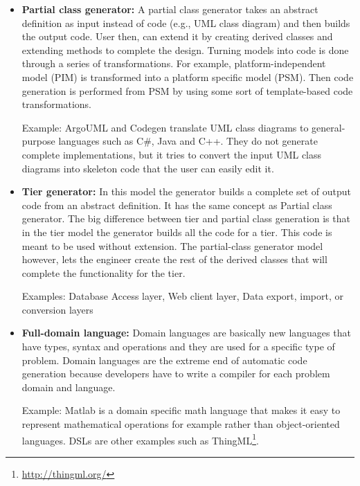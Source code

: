 \begin{itemize}
\item \textbf{Partial class generator:} A partial class generator takes an abstract definition as input instead of code (e.g., UML class diagram) and then builds the output code. User then, can extend it by creating derived classes and extending methods to complete the design. Turning models into code is done through a series of transformations. For example, platform-independent model (PIM) is transformed into a platform specific model (PSM). Then code generation is performed from PSM by using some sort of template-based code transformations.

Example: ArgoUML and Codegen translate UML class diagrams to general-purpose languages such as C\#, Java and C++. They do not generate complete implementations, but it tries to convert the input UML class diagrams into skeleton code that the user can easily edit it. 

\item \textbf{Tier generator:} In this model the generator builds a complete set of output code from an abstract definition. It has the same concept as Partial class generator. The big difference between tier and partial class generation is that in the tier model the generator builds all the code for a tier. This code is meant to be used without extension. The partial-class generator model however, lets the engineer create the rest of the derived classes that will complete the functionality for the tier.

Examples: Database Access layer, Web client layer, Data export, import, or conversion layers

\item \textbf{Full-domain language:} Domain languages are basically new languages that have types, syntax and operations and they are used for a specific type of problem. 
Domain languages are the extreme end of automatic code generation because developers have to write a compiler for each problem domain and language. 

Example: Matlab is a domain specific math language that makes it easy to represent mathematical operations for example rather than object-oriented languages. DSLs are other examples such as ThingML\footnote{\url{http://thingml.org/}}.

\end{itemize}
